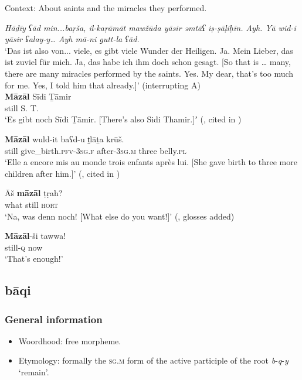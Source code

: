 \begin{exe}
	\ex Context: About saints and the miracles they performed.
	\begin{xlist}
		 \textit{Hāḏīy ʕād min...baṛša,	il-kaṛāmāt 	mawžūda yāsir	ǝmtāʕ iṣ-ṣāḷiḥīn. Ayh.	Yā wid-i yāsir	 ʕalay-y…	Ayh mā-ni	g̣utt-la ʕād.}\\
		 \lq Das ist also von... viele, es gibt viele Wunder der Heiligen. Ja. Mein Lieber,
das ist zuviel für mich. Ja, das habe ich ihm doch schon gesagt. [So that is … many, there are many miracles performed by the saints. Yes. My dear, that’s too much for me. Yes, I told him that already.]\rq
		 (interrupting A)\\
		\gll \textbf{Māzāl} {Sīdi Ṯāmir}\\
		still {S. T.}\\
		\glt \lq Es gibt noch Sīdi Ṯāmir. [There’s also Sidi Thamir.]ʼ (\cite[434–435]{RittBenmimoun2011}, cited in \cite{FischerEtAlTunisian})
	\end{xlist}
	
	\ex\label{exAppendixTunisianAdditive2}
	\gll \textbf{Māzāl}	wuld-it baʕd-u t̠lāṯa	krūš.\\
	still give\_birth.\textsc{pfv}-3\textsc{sg}.\textsc{f} after-3\textsc{sg}.\textsc{m} three belly.\textsc{pl}\\
	\glt \lq Elle a encore mis au monde trois enfants après lui. [She gave birth to three more children after him.]\rq{ }(\cite[1737]{MarcaisGuiga19581961}, cited in \cite{FischerEtAlTunisian})
	
	\ex\label{exAppendixTunisianAdditive3}
	\gll Āš \textbf{māzāl}  ṭṛah?\\
	what	still \textsc{hort}\\
	\glt \lq Na, was denn noch! [What else do you want!]\rq{ }(\cite[650]{Singer1984}, glosses added)

	\ex\label{exAppendixTunisianAdditive4}
	\gll \textbf{Māzāl}-ši tawwa!\\
	still-\textsc{q} now\\
	\glt \lq That's enough!\rq{ }\parencite{FischerEtAlTunisian}
\end{exe}

\subsection{bāqi}\label{appendixTunisianBaqi}
\subsubsection{General information}
\begin{itemize}
	\item Woordhood: free morpheme.
	\item Etymology: formally the \textsc{sg}.\textsc{m} form of the active participle of the root \mbox{\textit{b}-\textit{q}-\textit{y}} \lq remain\rq{}.
\end{itemize}

